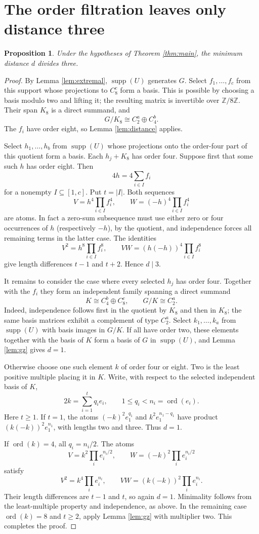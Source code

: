 \documentclass[11pt]{article}
\newtheorem{proposition}[theorem]{Proposition}
\theoremstyle{definition}
\newcommand{\supp}{\operatorname{supp}}
\newcommand{\ord}{\operatorname{ord}}
\begin{document}
\section{The order filtration leaves only distance three}

\begin{proposition}\label{prop:three}
Under the hypotheses of Theorem \ref{thm:main}, the minimum distance $d$ divides three.
\end{proposition}
\begin{proof}
By Lemma \ref{lem:extremal}, $\supp(U)$ generates $G$. Select $f_1,\ldots,f_c$ from this support whose projections to $C_8^c$ form a basis. This is possible by choosing a basis modulo two and lifting it; the resulting matrix is invertible over $\mathbb Z/8\mathbb Z$. Their span $K_8$ is a direct summand, and
\[
 G/K_8\cong C_2^a\oplus C_4^b.
\]
The $f_i$ have order eight, so Lemma \ref{lem:distance} applies.

Select $h_1,\ldots,h_b$ from $\supp(U)$ whose projections onto the order-four part of this quotient form a basis. Each $h_j+K_8$ has order four. Suppose first that some such $h$ has order eight. Then
\[
 4h=4\sum_{i\in I}f_i
\]
for a nonempty $I\subseteq[1,c]$. Put $t=|I|$. Both sequences
\[
 V=h^4\prod_{i\in I}f_i^4,
 \qquad W=(-h)^4\prod_{i\in I}f_i^4
\]
are atoms. In fact a zero-sum subsequence must use either zero or four occurrences of $h$ (respectively $-h$), by the quotient, and independence forces all remaining terms in the latter case. The identities
\[
 V^2=h^8\prod_{i\in I}f_i^8,
 \qquad VW=(h(-h))^4\prod_{i\in I}f_i^8
\]
give length differences $t-1$ and $t+2$. Hence $d\mid3$.

It remains to consider the case where every selected $h_j$ has order four. Together with the $f_i$ they form an independent family spanning a direct summand
\[
 K\cong C_4^b\oplus C_8^c,\qquad G/K\cong C_2^a.
\]
Indeed, independence follows first in the quotient by $K_8$ and then in $K_8$; the same basis matrices exhibit a complement of type $C_2^a$. Select $k_1,\ldots,k_a$ from $\supp(U)$ with basis images in $G/K$. If all have order two, these elements together with the basis of $K$ form a basis of $G$ in $\supp(U)$, and Lemma \ref{lem:gz} gives $d=1$.

Otherwise choose one such element $k$ of order four or eight. Two is the least positive multiple placing it in $K$. Write, with respect to the selected independent basis of $K$,
\[
 2k=\sum_{i=1}^t q_i e_i,\qquad
 1\leq q_i<n_i=\ord(e_i).
\]
Here $t\geq1$. If $t=1$, the atoms $(-k)^2e_1^{q_1}$ and $k^2e_1^{n_1-q_1}$ have product $(k(-k))^2e_1^{n_1}$, with lengths two and three. Thus $d=1$.

If $\ord(k)=4$, all $q_i=n_i/2$. The atoms
\[
 V=k^2\prod_i e_i^{n_i/2},\qquad
 W=(-k)^2\prod_i e_i^{n_i/2}
\]
satisfy
\[
 V^2=k^4\prod_i e_i^{n_i},\qquad
 VW=(k(-k))^2\prod_i e_i^{n_i}.
\]
Their length differences are $t-1$ and $t$, so again $d=1$. Minimality follows from the least-multiple property and independence, as above. In the remaining case $\ord(k)=8$ and $t\geq2$, apply Lemma \ref{lem:gz} with multiplier two. This completes the proof.
\end{proof}
\end{document}
